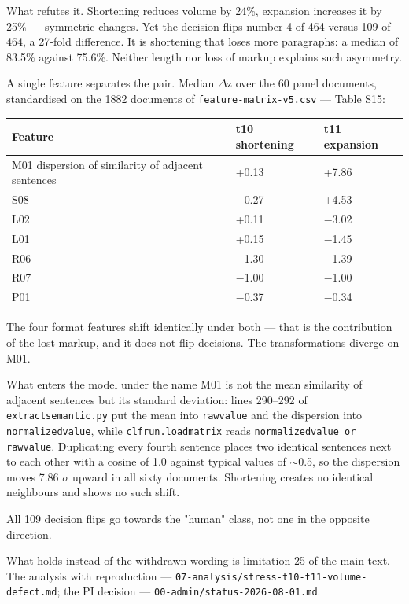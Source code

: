 \documentclass[11pt,a4paper]{article}
\renewcommand{\_}{\textunderscore\allowbreak}
\begin{document}
What refutes it. Shortening reduces volume by 24\%, expansion increases it by
25\% — symmetric changes. Yet the decision flips number 4 of 464 versus 109 of 464,
a 27-fold difference. It is shortening that loses more paragraphs: a median of 83.5\%
against 75.6\%. Neither length nor loss of markup explains such asymmetry.

A single feature separates the pair. Median $\Delta$z over the 60 panel documents,
standardised on the 1882 documents of \texttt{feature-\allowbreak{}matrix-\allowbreak{}v5.csv} — Table S15:

\begin{center}
\small
\begin{tabularx}{\textwidth}{Xll}
\toprule
Feature & t10 shortening & t11 expansion \\
\midrule
M01 dispersion of similarity of adjacent sentences & +0.13 & +7.86 \\
S08 & $-$0.27 & +4.53 \\
L02 & +0.11 & $-$3.02 \\
L01 & +0.15 & $-$1.45 \\
R06 & $-$1.30 & $-$1.39 \\
R07 & $-$1.00 & $-$1.00 \\
P01 & $-$0.37 & $-$0.34 \\
\bottomrule
\end{tabularx}
\end{center}

The four format features shift identically under both — that is the contribution
of the lost markup, and it does not flip decisions. The transformations diverge
on M01.

What enters the model under the name M01 is not the mean similarity of adjacent
sentences but its standard deviation: lines 290–292 of \texttt{extract\_semantic.py} put
the mean into \texttt{raw\_value} and the dispersion into \texttt{normalized\_value}, while
\texttt{clf\_run.load\_matrix} reads \texttt{normalized\_value or raw\_value}. Duplicating every
fourth sentence places two identical sentences next to each other with a cosine
of 1.0 against typical values of $\sim$0.5, so the dispersion moves 7.86 $\sigma$ upward in
all sixty documents. Shortening creates no identical neighbours and shows no
such shift.

All 109 decision flips go towards the "human" class, not one in the opposite direction.

What holds instead of the withdrawn wording is limitation 25 of the main text.
The analysis with reproduction — \texttt{07-\allowbreak{}analysis/stress-\allowbreak{}t10-\allowbreak{}t11-\allowbreak{}volume-\allowbreak{}defect.md};
the PI decision — \texttt{00-\allowbreak{}admin/status-\allowbreak{}2026-\allowbreak{}08-\allowbreak{}01.md}.
\end{document}
